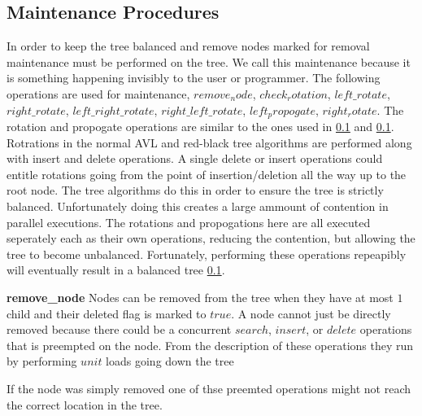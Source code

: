 \documentclass[10pt]{sigplanconf}
\begin{document}
\subsection{Maintenance Procedures}
In order to keep the tree balanced and remove nodes marked for removal maintenance must be performed on the tree.
We call this maintenance because it is something happening invisibly to the user or programmer.
The following operations are used for maintenance, $remove_node$, $check_rotation$, $left\_rotate$, $right\_rotate$, $left\_right\_rotate$, $right\_left\_rotate$, $left_propogate$, $right_rotate$.
The rotation and propogate operations are similar to the ones used in \ref{} and \ref{}.
Rotrations in the normal AVL and red-black tree algorithms are performed along with insert and delete operations.
A single delete or insert operations could entitle rotations going from the point of insertion/deletion all the way up to the root node.
The tree algorithms do this in order to ensure the tree is strictly balanced.
Unfortunately doing this creates a large ammount of contention in parallel executions.
The rotations and propogations here are all executed seperately each as their own operations, reducing the contention, but allowing the tree to become unbalanced.
Fortunately, performing these operations repeapibly will eventually result in a balanced tree \ref{}.

{\bf remove\_node} Nodes can be removed from the tree when they have at most $1$ child and their deleted flag is marked to $true$.
A node cannot just be directly removed because there could be a concurrent $search$, $insert$, or $delete$ operations that is preempted on the node.
From the description of these operations they run by performing $unit$ loads going down the tree 


If the node was simply removed one of thse preemted operations might not reach the correct location in the tree. 
\end{document}
